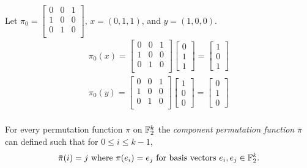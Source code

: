 \begin{example}
  Let $\pi_0=\begin{bmatrix}
               0&0&1\\
               1&0&0\\
               0&1&0\\
           \end{bmatrix}$, $x=(0,1,1)$, and $y=(1,0,0)$.
           \begin{align*}
             \pi_0(x)=\begin{bmatrix}
                 0&0&1\\
                 1&0&0\\
                 0&1&0\\
               \end{bmatrix}\begin{bmatrix}0\\1\\1\end{bmatrix}
								 =\begin{bmatrix}1\\0\\1\end{bmatrix}\\
             \pi_0(y)=\begin{bmatrix}
                 0&0&1\\
                 1&0&0\\
                 0&1&0\\
               \end{bmatrix}\begin{bmatrix}1\\0\\0\end{bmatrix}
								 =\begin{bmatrix}0\\1\\0\end{bmatrix}\\
           \end{align*}
\end{example}

\par For every permutation function $\pi$ on $\mathbb{F}_2^k$ the {\it component permutation
function} $\bar{\pi}$ can defined such that for $0 \leq i \leq k-1$,
\[
\bar{\pi}(i)=j \text{ where } \pi(e_i)=e_j \text{ for basis vectors } e_i,
e_j\in\mathbb{F}_2^k.
\]

